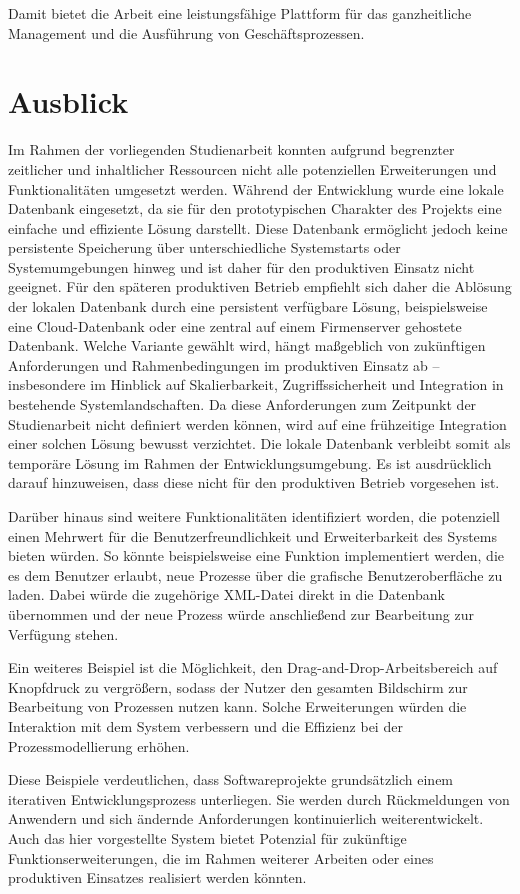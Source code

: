 Damit bietet die Arbeit eine leistungsfähige Plattform für das ganzheitliche Management und die Ausführung von Geschäftsprozessen.


\newpage
\section*{Ausblick}
Im Rahmen der vorliegenden Studienarbeit konnten aufgrund begrenzter zeitlicher und inhaltlicher Ressourcen nicht alle potenziellen Erweiterungen und Funktionalitäten umgesetzt werden. Während der Entwicklung wurde eine lokale Datenbank eingesetzt, da sie für den prototypischen Charakter des Projekts eine einfache und effiziente Lösung darstellt. Diese Datenbank ermöglicht jedoch keine persistente Speicherung über unterschiedliche Systemstarts oder Systemumgebungen hinweg und ist daher für den produktiven Einsatz nicht geeignet.
Für den späteren produktiven Betrieb empfiehlt sich daher die Ablösung der lokalen Datenbank durch eine persistent verfügbare Lösung, beispielsweise eine Cloud-Datenbank oder eine zentral auf einem Firmenserver gehostete Datenbank. Welche Variante gewählt wird, hängt maßgeblich von zukünftigen Anforderungen und Rahmenbedingungen im produktiven Einsatz ab – insbesondere im Hinblick auf Skalierbarkeit, Zugriffssicherheit und Integration in bestehende Systemlandschaften. Da diese Anforderungen zum Zeitpunkt der Studienarbeit nicht definiert werden können, wird auf eine frühzeitige Integration einer solchen Lösung bewusst verzichtet. Die lokale Datenbank verbleibt somit als temporäre Lösung im Rahmen der Entwicklungsumgebung. Es ist ausdrücklich darauf hinzuweisen, dass diese nicht für den produktiven Betrieb vorgesehen ist.

Darüber hinaus sind weitere Funktionalitäten identifiziert worden, die potenziell einen Mehrwert für die Benutzerfreundlichkeit und Erweiterbarkeit des Systems bieten würden. So könnte beispielsweise eine Funktion implementiert werden, die es dem Benutzer erlaubt, neue Prozesse über die grafische Benutzeroberfläche zu laden. Dabei würde die zugehörige XML-Datei direkt in die Datenbank übernommen und der neue Prozess würde anschließend zur Bearbeitung zur Verfügung stehen.

Ein weiteres Beispiel ist die Möglichkeit, den Drag-and-Drop-Arbeitsbereich auf Knopfdruck zu vergrößern, sodass der Nutzer den gesamten Bildschirm zur Bearbeitung von Prozessen nutzen kann. Solche Erweiterungen würden die Interaktion mit dem System verbessern und die Effizienz bei der Prozessmodellierung erhöhen.

Diese Beispiele verdeutlichen, dass Softwareprojekte grundsätzlich einem iterativen Entwicklungsprozess unterliegen. Sie werden durch Rückmeldungen von Anwendern und sich ändernde Anforderungen kontinuierlich weiterentwickelt. Auch das hier vorgestellte System bietet Potenzial für zukünftige Funktionserweiterungen, die im Rahmen weiterer Arbeiten oder eines produktiven Einsatzes realisiert werden könnten.




